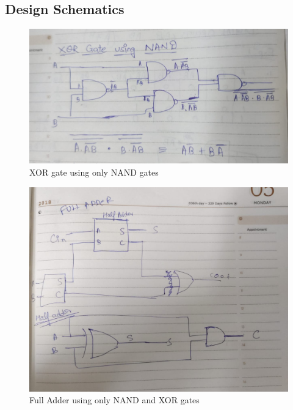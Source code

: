 \documentclass[12pt]{article}
\begin{document}
\subsection{Design Schematics}
\begin{figure}[h]
  \includegraphics[scale=0.3]{images/XOR_DESIGN.jpeg}  %
  \caption{XOR gate using only NAND gates}
  \label{XOR_schematic}
\end{figure}
\begin{figure}[h]
  \includegraphics[scale=0.3]{images/FULLADDER_DESIGN.jpeg}  %
  \caption{Full Adder using only NAND and XOR gates}
  \label{Full_adder_schematic}
\end{figure}
\end{document}

